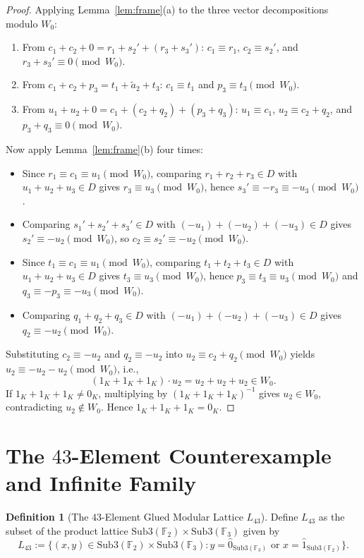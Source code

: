 \documentclass[11pt]{article}
\theoremstyle{definition}
\newtheorem{definition}[theorem]{Definition}
\newcommand{\FF}{\mathbb{F}}
\begin{document}
\begin{proof}
Applying Lemma~\ref{lem:frame}(a) to the three vector decompositions modulo $W_0$:
\begin{enumerate}
  \item From $c_1 + c_2 + 0 = r_1 + s_2' + (r_3 + s_3')$: $c_1 \equiv r_1$,
  $c_2 \equiv s_2'$, and $r_3 + s_3' \equiv 0 \pmod{W_0}$.
  \item From $c_1 + c_2 + p_3 = t_1 + \tilde{a}_2 + t_3$: $c_1 \equiv t_1$ and
  $p_3 \equiv t_3 \pmod{W_0}$.
  \item From $u_1 + u_2 + 0 = c_1 + (c_2 + q_2) + (p_3 + q_3)$: $u_1 \equiv c_1$,
  $u_2 \equiv c_2 + q_2$, and $p_3 + q_3 \equiv 0 \pmod{W_0}$.
\end{enumerate}
Now apply Lemma~\ref{lem:frame}(b) four times:
\begin{itemize}
  \item Since $r_1 \equiv c_1 \equiv u_1 \pmod{W_0}$, comparing $r_1 + r_2 + r_3 \in D$
  with $u_1 + u_2 + u_3 \in D$ gives $r_3 \equiv u_3 \pmod{W_0}$, hence
  $s_3' \equiv -r_3 \equiv -u_3 \pmod{W_0}$.
  \item Comparing $s_1' + s_2' + s_3' \in D$ with $(-u_1) + (-u_2) + (-u_3) \in D$ gives
  $s_2' \equiv -u_2 \pmod{W_0}$, so $c_2 \equiv s_2' \equiv -u_2 \pmod{W_0}$.
  \item Since $t_1 \equiv c_1 \equiv u_1 \pmod{W_0}$, comparing $t_1 + t_2 + t_3 \in D$
  with $u_1 + u_2 + u_3 \in D$ gives $t_3 \equiv u_3 \pmod{W_0}$, hence
  $p_3 \equiv t_3 \equiv u_3 \pmod{W_0}$ and $q_3 \equiv -p_3 \equiv -u_3 \pmod{W_0}$.
  \item Comparing $q_1 + q_2 + q_3 \in D$ with $(-u_1) + (-u_2) + (-u_3) \in D$ gives
  $q_2 \equiv -u_2 \pmod{W_0}$.
\end{itemize}
Substituting $c_2 \equiv -u_2$ and $q_2 \equiv -u_2$ into $u_2 \equiv c_2 + q_2
\pmod{W_0}$ yields $u_2 \equiv -u_2 - u_2 \pmod{W_0}$, i.e.,
\[
  (1_K + 1_K + 1_K) \cdot u_2 = u_2 + u_2 + u_2 \in W_0.
\]
If $1_K + 1_K + 1_K \ne 0_K$, multiplying by $(1_K + 1_K + 1_K)^{-1}$ gives
$u_2 \in W_0$, contradicting $u_2 \notin W_0$. Hence $1_K + 1_K + 1_K = 0_K$.
\end{proof}

\section{The \texorpdfstring{$43$}{43}-Element Counterexample and Infinite Family}

\begin{definition}[The $43$-Element Glued Modular Lattice $L_{43}$]\label{def:L43}
Define $L_{43}$ as the subset of the product lattice
$\mathrm{Sub3}(\FF_2) \times \mathrm{Sub3}(\FF_3)$ given by
\[
  L_{43} := \{(x, y) \in \mathrm{Sub3}(\FF_2) \times \mathrm{Sub3}(\FF_3) :
              y = \hat{0}_{\mathrm{Sub3}(\FF_3)} \text{ or }
              x = \hat{1}_{\mathrm{Sub3}(\FF_2)}\}.
\]
\end{definition}
\end{document}
